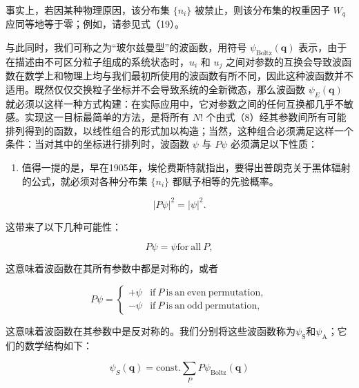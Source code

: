 事实上，若因某种物理原因，该分布集 \(\{n_i\}\) 被禁止，则该分布集的权重因子 \(W_q\) 应同等地等于零；例如，请参见式（19）。

与此同时，我们可称之为``玻尔兹曼型''的波函数，用符号 \(\psi_{\mathrm{Boltz}}(\boldsymbol{q})\) 表示，由于在描述由不可区分粒子组成的系统状态时，\(u_{i}\) 和 \(u_{j}\) 之间对参数的互换会导致波函数在数学上和物理上均与我们最初所使用的波函数有所不同，因此这种波函数并不适用。既然仅仅交换粒子坐标并不会导致系统的全新微态，那么波函数 \(\psi_{E}(\boldsymbol{q})\) 就必须以这样一种方式构建：在实际应用中，它对参数之间的任何互换都几乎不敏感。实现这一目标最简单的方法，是将所有 \(N!\) 个由式（8）经其参数间所有可能排列得到的函数，以线性组合的形式加以构造；当然，这种组合必须满足这样一个条件：当对其中的坐标进行排列时，波函数 \(\psi\) 与 \(P\psi\) 必须满足以下性质：

\begin{enumerate}
\def\labelenumi{\arabic{enumi}.}
\setcounter{enumi}{4}
\tightlist
\item
  值得一提的是，早在1905年，埃伦费斯特就指出，要得出普朗克关于黑体辐射的公式，就必须对各种分布集 \(\{n_{i}\}\) 都赋予相等的先验概率。
\end{enumerate}

\begin{equation}\tag{5.4.12}\label{eq:5.4.12}
| P \psi | ^{2} = | \psi | ^{2} .
\end{equation}

这带来了以下几种可能性：

\begin{equation}\tag{5.4.13}\label{eq:5.4.13}
P \psi = \psi  { \mathrm { f o r ~ a l l ~ } } P ,
\end{equation}

这意味着波函数在其所有参数中都是对称的，或者

\begin{equation}\tag{5.4.14}\label{eq:5.4.14}
P \psi = \left\{ \begin{array}{ll} { + \psi } & { \mathrm { i f ~ } P \mathrm { ~ i s ~ a n ~ e v e n ~ p e r m u t a t i o n , } } \\{ - \psi } & { \mathrm { i f ~ } P \mathrm { ~ i s ~ a n ~ o d d ~ p e r m u t a t i o n , } } \end{array} \right.
\end{equation}

这意味着波函数在其参数中是反对称的。我们分别将这些波函数称为\(\psi_{\mathrm{S}}\)和\(\psi_{\mathrm{A}}\)；它们的数学结构如下：

\begin{equation}\tag{5.4.15}\label{eq:5.4.15}
\psi _ { S } ( \pmb { q } ) = \mathrm { c o n s t . } \sum _ { P } P \psi _ { \mathrm { B o l t z } } ( \pmb { q } )
\end{equation}

